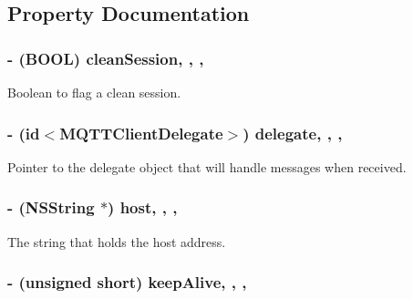 \subsection{Property Documentation}
\hypertarget{interface_m_q_t_t_client_a097920820d62efef6d17060fbabf3b09}{
\subsubsection[{clean\-Session}]{\setlength{\rightskip}{0pt plus 5cm}-\/ (B\-O\-O\-L) clean\-Session\hspace{0.3cm}{\ttfamily [read]}, {\ttfamily [write]}, {\ttfamily [atomic]}, {\ttfamily [assign]}}}\label{interface_m_q_t_t_client_a097920820d62efef6d17060fbabf3b09}
Boolean to flag a clean session. \hypertarget{interface_m_q_t_t_client_ae177aa16bf5c66e71db4c21820de7623}{
\subsubsection[{delegate}]{\setlength{\rightskip}{0pt plus 5cm}-\/ (id$<${\bf M\-Q\-T\-T\-Client\-Delegate}$>$) delegate\hspace{0.3cm}{\ttfamily [read]}, {\ttfamily [write]}, {\ttfamily [atomic]}, {\ttfamily [assign]}}}\label{interface_m_q_t_t_client_ae177aa16bf5c66e71db4c21820de7623}
Pointer to the delegate object that will handle messages when received. \hypertarget{interface_m_q_t_t_client_a1f617c2783f5f49fe0eade772b848330}{
\subsubsection[{host}]{\setlength{\rightskip}{0pt plus 5cm}-\/ (N\-S\-String $\ast$) host\hspace{0.3cm}{\ttfamily [read]}, {\ttfamily [write]}, {\ttfamily [atomic]}, {\ttfamily [retain]}}}\label{interface_m_q_t_t_client_a1f617c2783f5f49fe0eade772b848330}
The string that holds the host address. \hypertarget{interface_m_q_t_t_client_a39d172ccd9c5f7c4d7927a547c496d6e}{
\subsubsection[{keep\-Alive}]{\setlength{\rightskip}{0pt plus 5cm}-\/ (unsigned short) keep\-Alive\hspace{0.3cm}{\ttfamily [read]}, {\ttfamily [write]}, {\ttfamily [atomic]}, {\ttfamily [assign]}}}\label{interface_m_q_t_t_client_a39d172ccd9c5f7c4d7927a547c496d6e}
